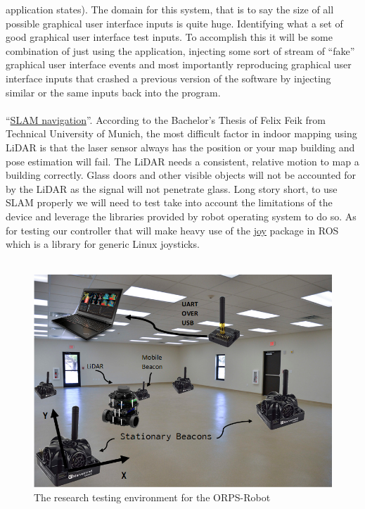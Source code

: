 \documentclass[english,12pt]{article}
\begin{document}
application states). The domain for this system, that is to say the size of all possible graphical 
user interface inputs is quite huge. Identifying what a set of good graphical user interface test
inputs. To accomplish this it will be some combination of just using the application, injecting some sort of 
stream of ``fake'' graphical user interface events and most importantly reproducing graphical user interface 
inputs that crashed a previous version of the software by injecting similar or the same inputs back into 
the program.
\\\\
``\href{https://husarion.com/tutorials/ros-tutorials/6-slam-navigation/}{SLAM navigation}''. 
According to the Bachelor's Thesis of Felix Feik from Technical University of Munich,
the most difficult factor in indoor mapping using LiDAR is that the laser sensor always has 
the position or your map building and pose estimation will fail. The LiDAR needs a consistent, 
relative motion to map a building correctly. Glass doors and other visible objects will not 
be accounted for by the LiDAR as the signal will not penetrate glass. Long story short, to use 
SLAM properly we will need to test take into account the limitations of the device and leverage 
the libraries provided by robot operating system to do so. As for testing our controller that will make heavy use of the 
\href{http://wiki.ros.org/joy#Microsoft_Xbox_360_Wired_Controller_for_Linux}{joy} 
package in ROS which is a library for generic Linux joysticks. \\\\
\begin{figure}[h!]
    \caption{The research testing environment for the ORPS-Robot}
    \centerline{\includegraphics[width = \textwidth]{beacons.jpg}}
\end{figure}
\end{document}
